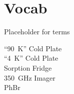\documentclass[10pt,twocolumn,article]{memoir}
\numberwithin{equation}{chapter}
\begin{document}












\chapter{Vocab}

Placeholder for terms

\begin{description}
\item[``90~K'' Cold Plate]
\item[``4~K'' Cold Plate]
\item[Sorption Fridge]
\item[350~GHz Imager]
\item[PhBr]

\end{description}

\printbibliography
\end{document}

